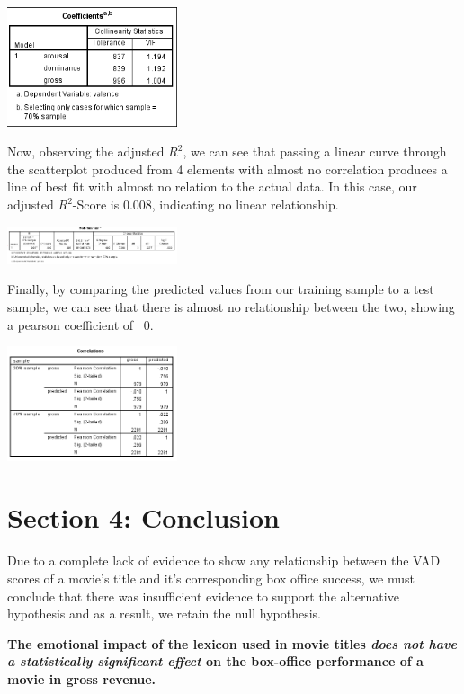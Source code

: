 \documentclass[font=10pt]{article}
\begin{document}
\begin{center}
	\includegraphics[width=5cm]{vif}
\end{center}

Now, observing the adjusted $R^{2}$, we can see that passing a linear curve through the scatterplot produced from 4 elements with almost no correlation produces a line of best fit with almost no relation to the actual data. In this case, our adjusted $R^{2}$-Score is 0.008, indicating no linear relationship.

\begin{center}
	\includegraphics[width=5cm]{summary}
\end{center}

Finally, by comparing the predicted values from our training sample to a test sample, we can see that there is almost no relationship between the two, showing a pearson coefficient of ~0.
\begin{center}
	\includegraphics[width=5cm]{crossvalidation}
\end{center}

  \section{Section 4: Conclusion}
Due to a complete lack of evidence to show any relationship between the VAD scores of a movie's title and it's corresponding box office success, we must conclude that there was insufficient evidence to support the alternative hypothesis and as a result, we retain the null hypothesis.

\textbf{The emotional impact of the lexicon used in movie titles \textit{does not have a statistically significant effect} on the box-office performance of a movie in gross revenue.}
\end{document}

